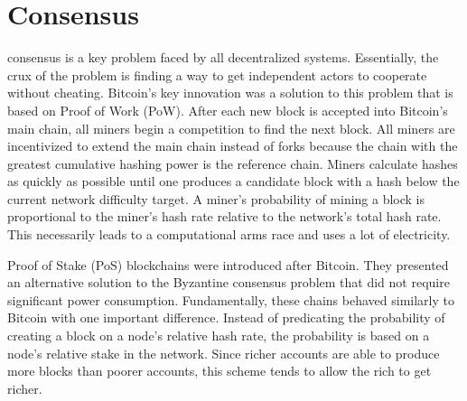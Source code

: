 \section{Consensus}
\label{sec:consensus}




 consensus is a key problem faced by all decentralized systems.
Essentially, the crux of the problem is finding a way to get independent actors to cooperate without cheating.
Bitcoin's key innovation was a solution to this problem that is based on Proof of Work (PoW).
After each new block is accepted into Bitcoin's main chain, all miners begin a competition to find the next block.
All miners are incentivized to extend the main chain instead of forks because the chain with the greatest cumulative hashing power is the reference chain.
Miners calculate hashes as quickly as possible until one produces a candidate block with a hash below the current network difficulty target.
A miner's probability of mining a block is proportional to the miner's hash rate relative to the network's total hash rate.
This necessarily leads to a computational arms race and uses a lot of electricity.

Proof of Stake (PoS)\cite{King:2012:PPP}\cite{Nxt2013} blockchains were introduced after Bitcoin.
They presented an alternative solution to the Byzantine consensus problem that did not require significant power consumption.
Fundamentally, these chains behaved similarly to Bitcoin with one important difference.
Instead of predicating the probability of creating a block on a node's relative hash rate, the probability is based on a node's relative stake in the network.
Since richer accounts are able to produce more blocks than poorer accounts, this scheme tends to allow the rich to get richer.


